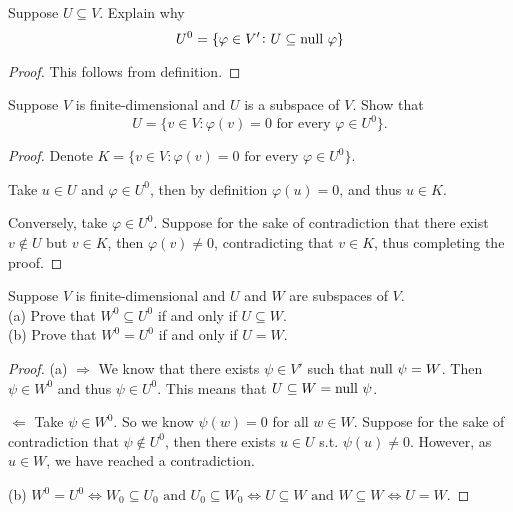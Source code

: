 \documentclass{extarticle}
\begin{document}
\begin{problem}{19}
    Suppose \(U \subseteq V\). Explain why 
    \[U^0 = \{\varphi \in V' \colon U \subseteq \text{null } \varphi\}\]
\end{problem}

\begin{proof}
This follows from definition. 
\end{proof}

\begin{problem}{20}
    Suppose \(V\) is finite-dimensional and \(U\) is a subspace of \(V\). Show that 
    \[U = \{v \in V \colon \varphi(v) = 0 \text{ for every } \varphi \in U^0\}.\]
\end{problem}

\begin{proof}

    Denote \(K = \{v \in V \colon \varphi(v) = 0 \text{ for every } \varphi \in U^0\}\).

Take \(u \in U\) and \(\varphi \in U^0\), then by definition \(\varphi(u) = 0\), and thus 
\(u \in K\). 

Conversely, take \(\varphi \in U^0\). Suppose for the sake of contradiction 
that there exist \(v \notin U\) but \(v \in K\), then \(\varphi(v) \neq 0\), contradicting that 
\(v \in K\), thus completing the proof. 

\end{proof}

\begin{problem}{21}
    Suppose \(V\) is finite-dimensional and \(U\) and \(W\) are subspaces of \(V\). \\ 
    (a) Prove that \(W^0 \subseteq U^0\) if and only if \(U \subseteq W\). \\ 
    (b) Prove that \(W^0 = U^0\) if and only if \(U = W\).  
\end{problem}


\begin{proof}
(a) \(\Rightarrow\) We know that there exists \(\psi \in V'\) such that \(\text{null } \psi = W\). Then 
\(\psi \in W^0\) and thus \(\psi \in U^0\). This means that \(U \subseteq W = \text{null } \psi \).

\(\Leftarrow\) Take \(\psi \in W^0\). So we know \(\psi(w) = 0\) for all \(w \in W\). Suppose 
for the sake of contradiction that \(\psi \notin U^0\), then there exists \(u \in U\) s.t. 
\(\psi(u) \neq 0\). However, as \(u \in W\), we have reached a contradiction. 


(b) \(W^0 = U^0 \Leftrightarrow W_0 \subseteq U_0 \text{ and } U_0 \subseteq W_0 
\Leftrightarrow U \subseteq W \text{ and } W \subseteq W \Leftrightarrow U = W\).
\end{proof}
\end{document}
